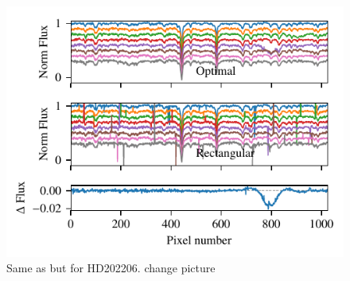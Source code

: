  \begin{figure}
    \centering
    \includegraphics[width=0.7\linewidth]{figures/appendix/bp_plots/extraction_comparision_HD202206-2_chip_1}
    \caption{Same as  but for HD202206. {\red{} change picture}}
    \label{fig:artefact_example4a}
\end{figure}

